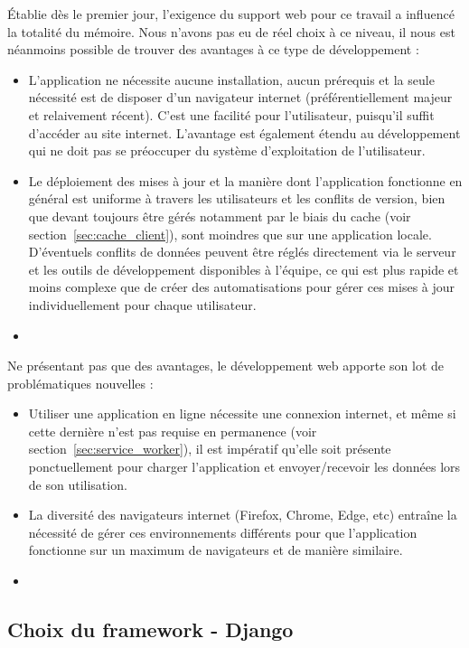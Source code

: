 \documentclass{EPL-master-thesis-covers-FR}
\begin{document}
				\'Etablie dès le premier jour, l'exigence du support web pour ce travail a influencé la totalité du mémoire. Nous n'avons pas eu de réel choix à ce niveau, il nous est néanmoins possible de trouver des avantages à ce type de développement :
				\begin{itemize}
					\item L'application ne nécessite aucune installation, aucun prérequis et la seule nécessité est de disposer d'un navigateur internet (préférentiellement majeur et relaivement récent). C'est une facilité pour l'utilisateur, puisqu'il suffit d'accéder au site internet. L'avantage est également étendu au développement qui ne doit pas se préoccuper du système d'exploitation de l'utilisateur.
					\item Le déploiement des mises à jour et la manière dont l'application fonctionne en général est uniforme à travers les utilisateurs et les conflits de version, bien que devant toujours être gérés notamment par le biais du cache (voir section~\ref{sec:cache_client}), sont moindres que sur une application locale. D'éventuels conflits de données peuvent être réglés directement via le serveur et les outils de développement disponibles à l'équipe, ce qui est plus rapide et moins complexe que de créer des automatisations pour gérer ces mises à jour individuellement pour chaque utilisateur.
					\item
				\end{itemize}

				Ne présentant pas que des avantages, le développement web apporte son lot de problématiques nouvelles :
				\begin{itemize}
					\item Utiliser une application en ligne nécessite une connexion internet, et même si cette dernière n'est pas requise en permanence (voir section~\ref{sec:service_worker}), il est impératif qu'elle soit présente ponctuellement pour charger l'application et envoyer/recevoir les données lors de son utilisation.
					\item La diversité des navigateurs internet (Firefox, Chrome, Edge, etc) entraîne la nécessité de gérer ces environnements différents pour que l'application fonctionne sur un maximum de navigateurs et de manière similaire.
					\item
				\end{itemize}

			\subsection*{Choix du framework - Django}
\end{document}
